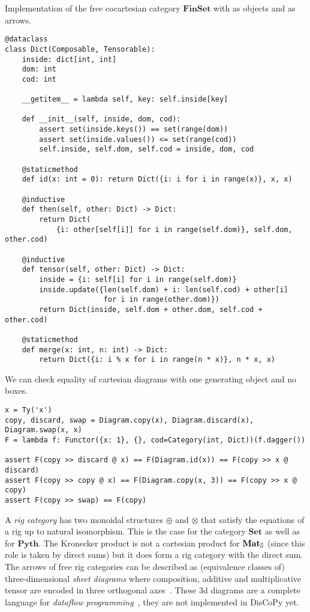 \begin{python}
Implementation of the free cocartesian category $\mathbf{FinSet}$ with  as objects and  as arrows.

\begin{verbatim}
@dataclass
class Dict(Composable, Tensorable):
    inside: dict[int, int]
    dom: int
    cod: int

    __getitem__ = lambda self, key: self.inside[key]

    def __init__(self, inside, dom, cod):
        assert set(inside.keys()) == set(range(dom))
        assert set(inside.values()) <= set(range(cod))
        self.inside, self.dom, self.cod = inside, dom, cod

    @staticmethod
    def id(x: int = 0): return Dict({i: i for i in range(x)}, x, x)

    @inductive
    def then(self, other: Dict) -> Dict:
        return Dict(
            {i: other[self[i]] for i in range(self.dom)}, self.dom, other.cod)

    @inductive
    def tensor(self, other: Dict) -> Dict:
        inside = {i: self[i] for i in range(self.dom)}
        inside.update({len(self.dom) + i: len(self.cod) + other[i]
                       for i in range(other.dom)})
        return Dict(inside, self.dom + other.dom, self.cod + other.cod)

    @staticmethod
    def merge(x: int, n: int) -> Dict:
        return Dict({i: i % x for i in range(n * x)}, n * x, x)
\end{verbatim}
\end{python}

\begin{example}
We can check equality of cartesian diagrams with one generating object and no boxes.

\begin{verbatim}
x = Ty('x')
copy, discard, swap = Diagram.copy(x), Diagram.discard(x), Diagram.swap(x, x)
F = lambda f: Functor({x: 1}, {}, cod=Category(int, Dict))(f.dagger())

assert F(copy >> discard @ x) == F(Diagram.id(x)) == F(copy >> x @ discard)
assert F(copy >> copy @ x) == F(Diagram.copy(x, 3)) == F(copy >> x @ copy)
assert F(copy >> swap) == F(copy)
\end{verbatim}
\end{example}

A \emph{rig category} has two monoidal structures $\oplus$ and $\otimes$ that satisfy the equations of a rig up to natural isomorphism.
This is the case for the category $\mathbf{Set}$ as well as for $\mathbf{Pyth}$.
The Kronecker product is not a cartesian product for $\mathbf{Mat}_\S$ (since this role is taken by direct sums) but it does form a rig category with the direct sum.
The arrows of free rig categories can be described as (equivalence classes of) three-dimensional \emph{sheet diagrams} where composition, additive and multiplicative tensor are encoded in three orthogonal axes~\cite{ComfortEtAl20}.
These 3d diagrams are a complete language for \emph{dataflow programming}~\cite{Delpeuch20a}, they are not implemented in DisCoPy yet.

